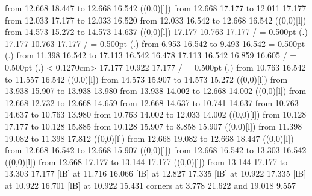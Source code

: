 {\putrule from 12.668 18.447 to 12.668 16.542
%
%
\linethickness=1pt
\setplotsymbol ({\makebox(0,0)[l]{\tencirc{}}})
\putrule from 12.668 17.177 to 12.011 17.177
\putrule from 12.033 17.177 to 12.033 16.520
\putrule from 12.033 16.542 to 12.668 16.542
%
%
\linethickness=1pt
\setplotsymbol ({\makebox(0,0)[l]{\tencirc{}}})
\putrule from 14.573 15.272 to 14.573 14.637
%
%
\linethickness=1pt
\setplotsymbol ({\makebox(0,0)[l]{\tencirc{}}})
 17.177 10.763 17.177 /
%
%
\linethickness= 0.500pt
\setplotsymbol ({\thinlinefont .})
 17.177 10.763 17.177 /
%
%
\linethickness= 0.500pt
\setplotsymbol ({\thinlinefont .})
\putrule from  6.953 16.542 to  9.493 16.542
%
%
\linethickness= 0.500pt
\setplotsymbol ({\thinlinefont .})
\putrule from 11.398 16.542 to 17.113 16.542
%
%
 16.478 17.113 16.542 16.859 16.605 /
%
%
%
\linethickness= 0.500pt
\setplotsymbol ({\thinlinefont .})
\setdashes < 0.1270cm>
 17.177 10.922 17.177 /
%
%
\linethickness= 0.500pt
\setplotsymbol ({\thinlinefont .})
\setsolid
\putrule from 10.763 16.542 to 11.557 16.542
%
%
\linethickness=1pt
\setplotsymbol ({\makebox(0,0)[l]{\tencirc{}}})
\putrule from 14.573 15.907 to 14.573 15.272
%
%
\linethickness=1pt
\setplotsymbol ({\makebox(0,0)[l]{\tencirc{}}})
\putrule from 13.938 15.907 to 13.938 13.980
\putrule from 13.938 14.002 to 12.668 14.002
%
%
\linethickness=1pt
\setplotsymbol ({\makebox(0,0)[l]{\tencirc{}}})
\putrule from 12.668 12.732 to 12.668 14.659
\putrule from 12.668 14.637 to 10.741 14.637
\putrule from 10.763 14.637 to 10.763 13.980
\putrule from 10.763 14.002 to 12.033 14.002
%
%
\linethickness=1pt
\setplotsymbol ({\makebox(0,0)[l]{\tencirc{}}})
\putrule from 10.128 17.177 to 10.128 15.885
\putrule from 10.128 15.907 to  8.858 15.907
%
%
\linethickness=1pt
\setplotsymbol ({\makebox(0,0)[l]{\tencirc{}}})
\putrule from 11.398 19.082 to 11.398 17.812
%
%
\linethickness=1pt
\setplotsymbol ({\makebox(0,0)[l]{\tencirc{}}})
\putrule from 12.668 19.082 to 12.668 18.447
%
%
\linethickness=1pt
\setplotsymbol ({\makebox(0,0)[l]{\tencirc{}}})
\putrule from 12.668 16.542 to 12.668 15.907
%
%
\linethickness=1pt
\setplotsymbol ({\makebox(0,0)[l]{\tencirc{}}})
\putrule from 12.668 16.542 to 13.303 16.542
%
%
\linethickness=1pt
\setplotsymbol ({\makebox(0,0)[l]{\tencirc{}}})
\putrule from 12.668 17.177 to 13.144 17.177
%
%
\linethickness=1pt
\setplotsymbol ({\makebox(0,0)[l]{\tencirc{}}})
\putrule from 13.144 17.177 to 13.303 17.177
%
%
 [lB] at 11.716 16.066
%
%
 [lB] at 12.827 17.335
%
%
 [lB] at 10.922 17.335
%
%
 [lB] at 10.922 16.701
%
%
 [lB] at 10.922 15.431
\linethickness=0pt
\putrectangle corners at  3.778 21.622 and 19.018  9.557
\endpicture}
